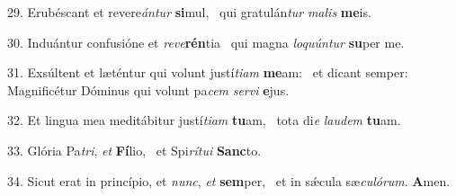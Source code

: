 29. Erubéscant et revere\textit{án}\textit{tur} \textbf{si}mul, \ast\  qui gratulán\textit{tur} \textit{ma}\textit{lis} \textbf{me}is.\

30. Induántur confusióne et \textit{re}\textit{ve}\textbf{rén}tia \ast\  qui magna \textit{lo}\textit{quún}\textit{tur} \textbf{su}per me.\

31. Exsúltent et læténtur qui volunt justí\textit{ti}\textit{am} \textbf{me}am: \ast\  et dicant semper: Magnificétur Dóminus qui volunt pa\textit{cem} \textit{ser}\textit{vi} \textbf{e}jus.\

32. Et lingua mea meditábitur justí\textit{ti}\textit{am} \textbf{tu}am, \ast\  tota di\textit{e} \textit{lau}\textit{dem} \textbf{tu}am.\

33. Glória Pa\textit{tri}, \textit{et} \textbf{Fí}lio, \ast\  et Spi\textit{rí}\textit{tu}\textit{i} \textbf{Sanc}to.\

34. Sicut erat in princípio, et \textit{nunc}, \textit{et} \textbf{sem}per, \ast\  et in sǽcula sæ\textit{cu}\textit{ló}\textit{rum}. \textbf{A}men.\

